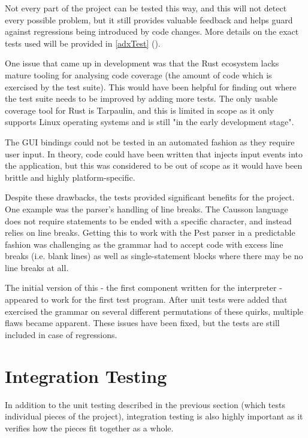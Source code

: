 \documentclass[11pt]{report}
\begin{document}
Not every part of the project can be tested this way, and this will not detect every possible problem, but it still provides valuable feedback and helps guard against regressions being introduced by code changes. More details on the exact tests used will be provided in \cref{adxTest} (\emph{}).

One issue that came up in development was that the Rust ecosystem lacks mature tooling for analysing code coverage (the amount of code which is exercised by the test suite). This would have been helpful for finding out where the test suite needs to be improved by adding more tests. The only usable coverage tool for Rust is Tarpaulin, and this is limited in scope as it only supports Linux operating systems and is still "in the early development stage"\cite{Tarpaulin}.

The GUI bindings could not be tested in an automated fashion as they require user input. In theory, code could have been written that injects input events into the application, but this was considered to be out of scope as it would have been brittle and highly platform-specific.

Despite these drawbacks, the tests provided significant benefits for the project. One example was the parser's handling of line breaks. The Causson language does not require statements to be ended with a specific character, and instead relies on line breaks. Getting this to work with the Pest parser in a predictable fashion was challenging as the grammar had to accept code with excess line breaks (i.e. blank lines) as well as single-statement blocks where there may be no line breaks at all.

The initial version of this - the first component written for the interpreter - appeared to work for the first test program. After unit tests were added that exercised the grammar on several different permutations of these quirks, multiple flaws became apparent. These issues have been fixed, but the tests are still included in case of regressions.

\section{Integration Testing}

In addition to the unit testing described in the previous section (which tests individual pieces of the project), integration testing is also highly important as it verifies how the pieces fit together as a whole.
\end{document}

